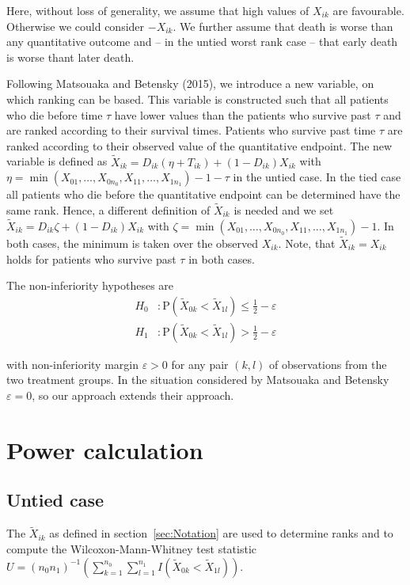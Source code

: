 \documentclass[bimj,fleqn]{w-art}\usepackage[]{graphicx}\usepackage[]{color}
\theoremstyle{plain}
\theoremstyle{definition}
\begin{document}
Here, without loss of generality, we assume that high values of $X_{ik}$ are
favourable. Otherwise we could consider $-X_{ik}$. We further assume that
death is worse than any quantitative outcome and -- in the untied worst rank
case -- that early death is worse thant later death.

Following Matsouaka and Betensky (2015), we introduce a new variable, on which
ranking can be based. This variable is constructed such that all patients who
die before time $\tau$ have lower values than the patients who survive past
$\tau$ and are ranked according to their survival times. Patients who survive
past time $\tau$ are ranked according to their observed value of the quantitative
endpoint. The new variable is defined as
$\widetilde{X}_{ik} = D_{ik}(\eta  + T_{ik}) + (1 - D_{ik})X_{ik}$ with
$\eta = \min(X_{01}, \ldots, X_{0n_0}, X_{11}, \ldots, X_{1n_1}) - 1 - \tau$
in the untied case. In the tied case all patients who die before the quantitative endpoint
can be determined have the same rank. Hence, a different definition of $\widetilde{X}_{ik}$
is needed and we set  $\widetilde{X}_{ik} = D_{ik}\zeta   + (1 - D_{ik})X_{ik}$
with $\zeta = \min(X_{01}, \ldots, X_{0n_0}, X_{11}, \ldots, X_{1n_1}) - 1$.
In both cases, the minimum is taken over the observed $X_{ik}$.
Note, that  $\widetilde{X}_{ik} = {X}_{ik}$ holds for patients who survive past $\tau$ in both cases.

  The non-inferiority hypotheses are
\begin{align*}
  H_0 &:  \text{P}(\widetilde{X}_{0k} < \widetilde{X}_{1l})
          \leq \frac{1}{2} - \varepsilon \\
H_1 &:  \text{P}(\widetilde{X}_{0k} < \widetilde{X}_{1l})
          > \frac{1}{2} - \varepsilon
\end{align*}

with non-inferiority margin $\varepsilon > 0$ for any pair $(k, l)$ of
observations from the two treatment groups. In the situation considered by Matsouaka
and Betensky $\varepsilon = 0 $, so our approach extends their approach.

\section{Power calculation}
\label{sec:Power}
\subsection{Untied case}
\label{sec:PowerUntied}
The $\widetilde{X}_{ik}$ as defined in section~\ref{sec:Notation} are used to
  determine ranks and to compute the Wilcoxon-Mann-Whitney test statistic
  $ U =(n_0 n_1)^{-1}(\sum_{k=1}^{n_0}
    \sum_{l=1}^{n_1}I(\widetilde{X}_{0k} < \widetilde{X}_{1l})) $.
\end{document}
